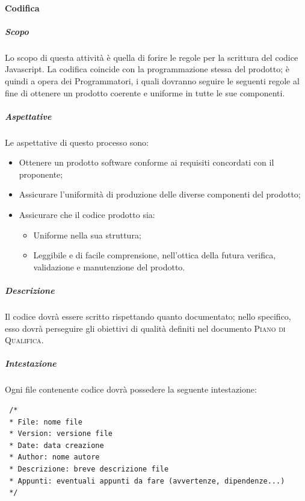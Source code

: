 \documentclass[../norme-di-progetto.tex]{subfiles}
\begin{document}
\paragraph{Codifica}
\subparagraph{Scopo}
Lo scopo di questa attività è quella di forire le regole per la scrittura del codice Javascript. La codifica coincide con la programmazione stessa del prodotto; è quindi a opera dei Programmatori, i quali dovranno seguire le seguenti regole al fine di ottenere un prodotto coerente e uniforme in tutte le sue componenti.
\subparagraph{Aspettative}
Le aspettative di questo processo sono:
\begin{itemize}
  \item Ottenere un prodotto software conforme ai requisiti concordati con il proponente;
  \item Assicurare l'uniformità di produzione delle diverse componenti del prodotto;
  \item Assicurare che il codice prodotto sia:
  \begin{itemize}
    \item Uniforme nella sua struttura;
    \item Leggibile e di facile comprensione, nell'ottica della futura verifica, validazione e manutenzione del prodotto.
  \end{itemize}
\end{itemize}
\subparagraph{Descrizione}
Il codice dovrà essere scritto rispettando quanto documentato; nello specifico, esso dovrà perseguire gli obiettivi di qualità definiti nel documento \textsc{Piano di Qualifica}.

\subparagraph{Intestazione}
Ogni file contenente codice dovrà possedere la seguente intestazione:
\begin{lstlisting}
 /*
 * File: nome file
 * Version: versione file
 * Date: data creazione
 * Author: nome autore
 * Descrizione: breve descrizione file
 * Appunti: eventuali appunti da fare (avvertenze, dipendenze...)
 */
\end{lstlisting}
\end{document}
